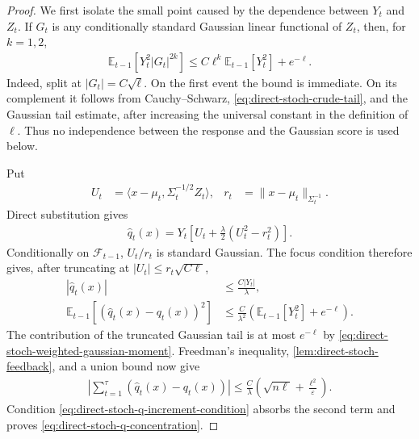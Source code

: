 \documentclass{article}
\theoremstyle{plain}
\theoremstyle{definition}
\theoremstyle{plain}
\newcommand{\E}{\mathbb E}
\begin{document}
\begin{proof}
    We first isolate the small point caused by the dependence between
    $Y_t$ and $Z_t$.  If $G_t$ is any conditionally standard Gaussian
    linear functional of $Z_t$, then, for $k=1,2$,
    \begin{align}
        \E_{t-1}\left[Y_t^2|G_t|^{2k}\right]
        \leq
        C\ell^k\E_{t-1}[Y_t^2]+e^{-\ell}.
        \label{eq:direct-stoch-weighted-gaussian-moment}
    \end{align}
    Indeed, split at $|G_t|=C\sqrt\ell$.  On the first event the
    bound is immediate.  On its complement it follows from
    Cauchy--Schwarz, \eqref{eq:direct-stoch-crude-tail}, and the
    Gaussian tail estimate, after increasing the universal constant
    in the definition of $\ell$.  Thus no independence between the
    response and the Gaussian score is used below.

    Put
    \begin{align}
        U_t
            & =\langle x-\mu_t,\Sigma_t^{-1/2}Z_t\rangle,
            &
        r_t & =\|x-\mu_t\|_{\Sigma_t^{-1}}.
    \end{align}
    Direct substitution gives
    \begin{align}
        \widehat q_t(x)
        =Y_t\left[
            U_t+\frac\lambda2(U_t^2-r_t^2)
            \right].
        \label{eq:direct-stoch-q-formula}
    \end{align}
    Conditionally on $\mathcal F_{t-1}$, $U_t/r_t$ is standard
    Gaussian.  The focus condition therefore gives, after truncating
    at $|U_t|\leq r_t\sqrt{C\ell}$,
    \begin{align}
        |\widehat q_t(x)| & \leq\frac{C|Y_t|}{\lambda},
        \\
        \E_{t-1}\left[
            (\widehat q_t(x)-q_t(x))^2
            \right]
                          & \leq
        \frac{C}{\lambda^2}
        \left(\E_{t-1}[Y_t^2]+e^{-\ell}\right).
    \end{align}
    The contribution of the truncated Gaussian tail is at most
    $e^{-\ell}$ by
    \eqref{eq:direct-stoch-weighted-gaussian-moment}.  Freedman's inequality,
    \cref{lem:direct-stoch-feedback}, and a union bound now give
    \begin{align}
        \left|
        \sum_{t=1}^{\tau}
        (\widehat q_t(x)-q_t(x))
        \right|
        \leq
        \frac{C}{\lambda}\left(
        \sqrt{n\ell}+\frac{\ell^2}{\varepsilon}
        \right).
    \end{align}
    Condition \eqref{eq:direct-stoch-q-increment-condition} absorbs
    the second term and proves
    \eqref{eq:direct-stoch-q-concentration}.


\end{proof}
\end{document}
